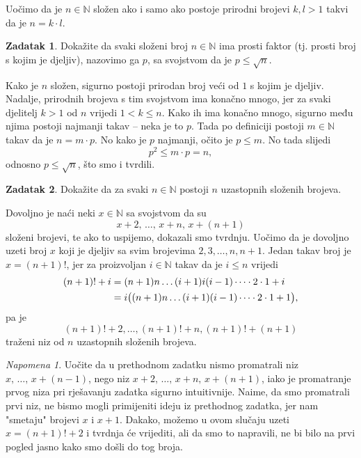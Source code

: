 \documentclass{book}
\let\originalleft\left
\let\originalright\right
\renewcommand{\left}{\mathopen{}\mathclose\bgroup\originalleft}
\renewcommand{\right}{\aftergroup\egroup\originalright}
\renewenvironment{proof}{%
    \vspace{-\parskip}\begin{oldproof}%
    }{%
    \end{oldproof}%
}
\theoremstyle{definition}
\theoremstyle{definition}
\newtheorem{exercise}{Zadatak}
\theoremstyle{remark}
\newtheorem{remark}{Napomena}
\begin{document}
\noindent Uočimo da je $n\in \mathbb{N}$ složen ako i samo ako postoje prirodni brojevi $k, l>1$ takvi da je $n=k\cdot l$.
\begin{exercise}
Dokažite da svaki složeni broj $n\in \mathbb{N}$ ima prosti faktor (tj. prosti broj s kojim je djeljiv), nazovimo ga $p$, sa svojstvom da je $p\leq \sqrt{n}$.
\end{exercise}
\begin{proof}[Rješenje]
Kako je $n$ složen, sigurno postoji prirodan broj veći od $1$ s kojim je djeljiv. Nadalje, prirodnih brojeva s tim svojstvom ima konačno mnogo, jer za svaki djelitelj $k>1$ od $n$ vrijedi $1<k\leq n$. Kako ih ima konačno mnogo, sigurno među njima postoji najmanji takav -- neka je to $p$. Tada po definiciji postoji $m\in \mathbb{N}$ takav da je $n=m\cdot p$. No kako je $p$ najmanji, očito je $p\leq m$. No tada slijedi $$p^2\leq m\cdot p=n,$$ odnosno $p\leq \sqrt{n}$, što smo i tvrdili.
\end{proof}
\begin{exercise}
Dokažite da za svaki $n\in \mathbb{N}$ postoji $n$ uzastopnih složenih brojeva.
\end{exercise}
\begin{proof}[Rješenje]
Dovoljno je naći neki $x\in \mathbb{N}$ sa svojstvom da su 
$$x+2,\, \dots,\, x+n,\, x+(n+1)$$ 
složeni brojevi, te ako to uspijemo, dokazali smo tvrdnju. Uočimo da je dovoljno uzeti broj $x$ koji je djeljiv sa svim brojevima $2, 3, \dots, n, n+1$. Jedan takav broj je $x=(n+1)!$, jer za proizvoljan $i\in \mathbb{N}$ takav da je $i\leq n$ vrijedi
\begin{align*}
(n+1)!+i&=(n+1)n\dots (i+1)i(i-1)\dots\cdot2\cdot1+i\\
&=i\left((n+1)n\dots (i+1)(i-1)\dots\cdot2\cdot1+1\right),
\end{align*}
pa je $$(n+1)!+2, \dots, (n+1)!+n, (n+1)!+(n+1)$$
traženi niz od $n$ uzastopnih složenih brojeva.
\end{proof}
\begin{remark}
Uočite da u prethodnom zadatku nismo promatrali niz $x,\, \dots,\, x+(n-1)$, nego niz $x+2,\, \dots,\, x+n,\, x+(n+1)$, iako je promatranje prvog niza pri rješavanju zadatka sigurno intuitivnije. Naime, da smo promatrali prvi niz, ne bismo mogli primijeniti ideju iz prethodnog zadatka, jer nam "smetaju" brojevi $x$ i $x+1$. Dakako, možemo u ovom slučaju uzeti $x=(n+1)!+2$ i tvrdnja će vrijediti, ali da smo to napravili, ne bi bilo na prvi pogled jasno kako smo došli do tog broja.
\end{remark}
\end{document}
